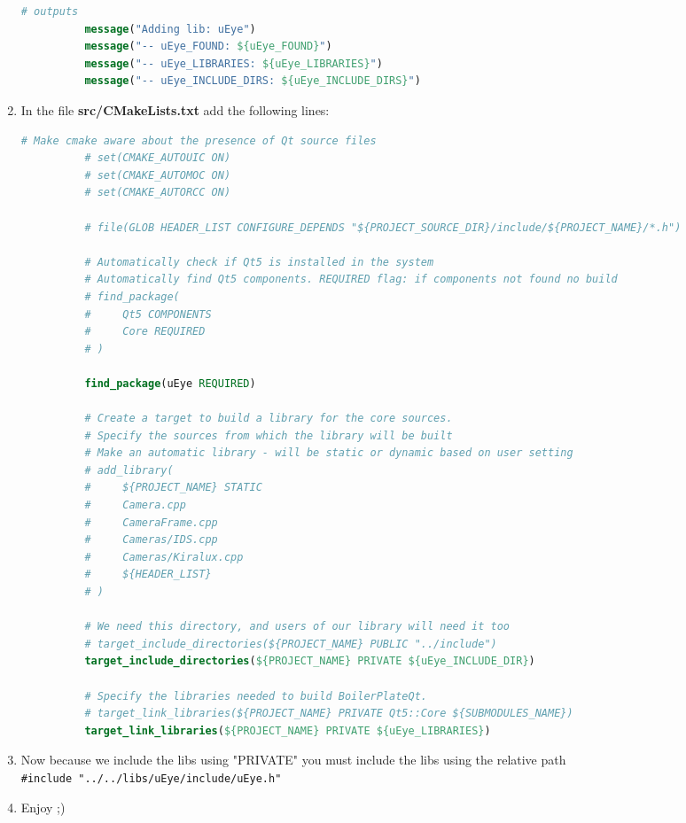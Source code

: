 \begin{enumerate}
\begin{lstlisting}[language=cmake, gobble=10]
          # outputs
          message("Adding lib: uEye")
          message("-- uEye_FOUND: ${uEye_FOUND}")
          message("-- uEye_LIBRARIES: ${uEye_LIBRARIES}")
          message("-- uEye_INCLUDE_DIRS: ${uEye_INCLUDE_DIRS}")
        \end{lstlisting}
  \item
        In the file \textbf{src/CMakeLists.txt} add the following lines:

        \begin{lstlisting}[language=cmake, gobble=10]
          # Make cmake aware about the presence of Qt source files
          # set(CMAKE_AUTOUIC ON)
          # set(CMAKE_AUTOMOC ON)
          # set(CMAKE_AUTORCC ON)

          # file(GLOB HEADER_LIST CONFIGURE_DEPENDS "${PROJECT_SOURCE_DIR}/include/${PROJECT_NAME}/*.h")

          # Automatically check if Qt5 is installed in the system
          # Automatically find Qt5 components. REQUIRED flag: if components not found no build
          # find_package(
          #     Qt5 COMPONENTS
          #     Core REQUIRED
          # )

          find_package(uEye REQUIRED)

          # Create a target to build a library for the core sources.
          # Specify the sources from which the library will be built
          # Make an automatic library - will be static or dynamic based on user setting
          # add_library(
          #     ${PROJECT_NAME} STATIC
          #     Camera.cpp
          #     CameraFrame.cpp
          #     Cameras/IDS.cpp
          #     Cameras/Kiralux.cpp
          #     ${HEADER_LIST}
          # )

          # We need this directory, and users of our library will need it too
          # target_include_directories(${PROJECT_NAME} PUBLIC "../include")
          target_include_directories(${PROJECT_NAME} PRIVATE ${uEye_INCLUDE_DIR})

          # Specify the libraries needed to build BoilerPlateQt.
          # target_link_libraries(${PROJECT_NAME} PRIVATE Qt5::Core ${SUBMODULES_NAME})
          target_link_libraries(${PROJECT_NAME} PRIVATE ${uEye_LIBRARIES})
        \end{lstlisting}
  \item
        Now because we include the libs using "PRIVATE" you must include the
        libs using the relative path
        \texttt{\#include\ "../../libs/uEye/include/uEye.h"}
  \item
        Enjoy ;)
\end{enumerate}